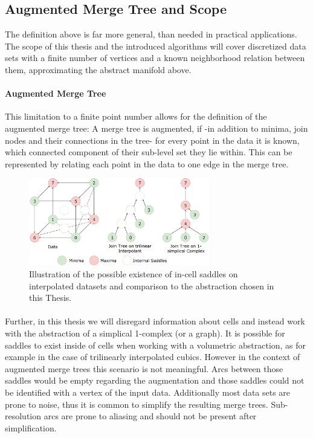 \documentclass{scrartcl}
\begin{document}
\subsection{Augmented Merge Tree and Scope}
The definition above is far more general, than needed in practical applications. The scope of this thesis and the introduced algorithms will cover discretized data sets with a finite number of vertices and a known neighborhood relation between them, approximating the abstract manifold above. 

\paragraph{Augmented Merge Tree} This limitation to a finite point number allows for the definition of the augmented merge tree: A merge tree is augmented, if -in addition to minima, join nodes and their connections in the tree- for every point in the data it is known, which connected component of their sub-level set they lie within. This can be represented by relating each point in the data to one edge in the merge tree. 

\begin{figure}[h!]
\centering
\includegraphics[width=0.7\textwidth]{figures/Ambiguity.pdf}
\caption{Illustration of the possible existence of in-cell saddles on interpolated datasets and comparison to the abstraction chosen in this Thesis.}
\label{fig:csc}
\end{figure}

\paragraph{} Further, in this thesis we will disregard information about cells and instead work with the abstraction of a simplical 1-complex (or a graph). It is possible for saddles to exist inside of cells when working with a volumetric abstraction, as for example in the case of trilinearly interpolated cubics. However in the context of augmented merge trees this scenario is not meaningful. Arcs between those saddles would be empty regarding the augmentation and those saddles could not be identified with a vertex of the input data. Additionally most data sets are prone to noise, thus it is common to simplify the resulting merge trees. Sub-resolution arcs are prone to aliasing and should not be present after simplification. 
\end{document}
